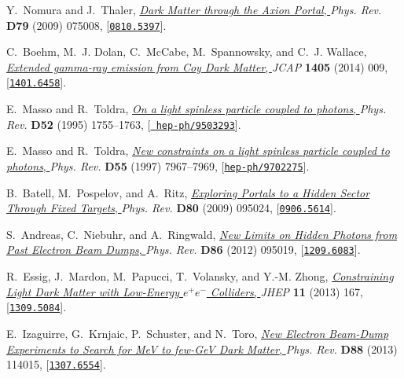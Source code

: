 \documentclass[11pt,a4paper]{article}
\begin{document}
\begin{thebibliography}{10}
Y.~Nomura and J.~Thaler,
  \href{http://dx.doi.org/10.1103/PhysRevD.79.075008}{{\it {Dark Matter through
  the Axion Portal}}, } {\em Phys. Rev.} {\bf D79} (2009) 075008,
  [\href{http://arxiv.org/abs/0810.5397}{{\tt 0810.5397}}].

C.~Boehm, M.~J. Dolan, C.~McCabe, M.~Spannowsky, and C.~J. Wallace,
  \href{http://dx.doi.org/10.1088/1475-7516/2014/05/009}{{\it {Extended
  gamma-ray emission from Coy Dark Matter}}, } {\em JCAP} {\bf 1405} (2014)
  009, [\href{http://arxiv.org/abs/1401.6458}{{\tt 1401.6458}}].

E.~Masso and R.~Toldra, \href{http://dx.doi.org/10.1103/PhysRevD.52.1755}{{\it
  {On a light spinless particle coupled to photons}}, } {\em Phys. Rev.} {\bf
  D52} (1995) 1755--1763, [\href{http://arxiv.org/abs/hep-ph/9503293}{{\tt
  hep-ph/9503293}}].

E.~Masso and R.~Toldra, \href{http://dx.doi.org/10.1103/PhysRevD.55.7967}{{\it
  {New constraints on a light spinless particle coupled to photons}}, } {\em
  Phys. Rev.} {\bf D55} (1997) 7967--7969,
  [\href{http://arxiv.org/abs/hep-ph/9702275}{{\tt hep-ph/9702275}}].

B.~Batell, M.~Pospelov, and A.~Ritz,
  \href{http://dx.doi.org/10.1103/PhysRevD.80.095024}{{\it {Exploring Portals
  to a Hidden Sector Through Fixed Targets}}, } {\em Phys. Rev.} {\bf D80}
  (2009) 095024, [\href{http://arxiv.org/abs/0906.5614}{{\tt 0906.5614}}].

S.~Andreas, C.~Niebuhr, and A.~Ringwald,
  \href{http://dx.doi.org/10.1103/PhysRevD.86.095019}{{\it {New Limits on
  Hidden Photons from Past Electron Beam Dumps}}, } {\em Phys. Rev.} {\bf D86}
  (2012) 095019, [\href{http://arxiv.org/abs/1209.6083}{{\tt 1209.6083}}].

R.~Essig, J.~Mardon, M.~Papucci, T.~Volansky, and Y.-M. Zhong,
  \href{http://dx.doi.org/10.1007/JHEP11(2013)167}{{\it {Constraining Light
  Dark Matter with Low-Energy $e^+e^-$ Colliders}}, } {\em JHEP} {\bf 11}
  (2013) 167, [\href{http://arxiv.org/abs/1309.5084}{{\tt 1309.5084}}].

E.~Izaguirre, G.~Krnjaic, P.~Schuster, and N.~Toro,
  \href{http://dx.doi.org/10.1103/PhysRevD.88.114015}{{\it {New Electron
  Beam-Dump Experiments to Search for MeV to few-GeV Dark Matter}}, } {\em
  Phys. Rev.} {\bf D88} (2013) 114015,
  [\href{http://arxiv.org/abs/1307.6554}{{\tt 1307.6554}}].


\end{thebibliography}
\end{document}

